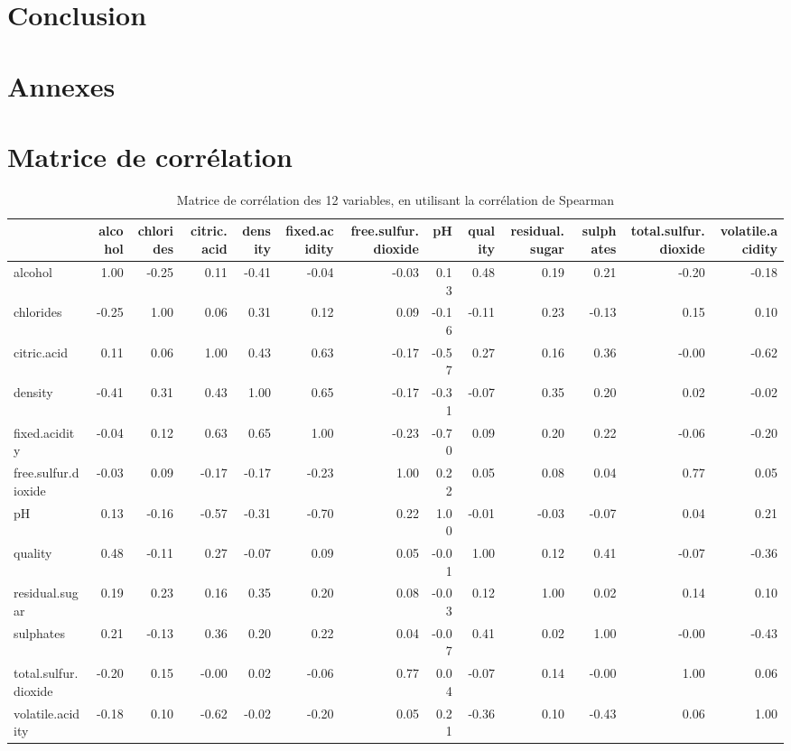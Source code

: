 \documentclass[11pt,a4paper]{article}
\begin{document}
\section{Conclusion}

\newpage
\section{Annexes}
\appendix
\section{Matrice de corrélation}
\label{sec:cor}
\begin{table}[h]
	\centering
	\begin{adjustbox}{width=1\textwidth}
	\begin{tabular}{lrrrrrrrrrrrr}
		\hline
		& alcohol & chlorides & citric.acid & density & fixed.acidity & free.sulfur.dioxide & pH & quality & residual.sugar & sulphates & total.sulfur.dioxide & volatile.acidity \\ 
		\hline
		alcohol & 1.00 & -0.25 & 0.11 & -0.41 & -0.04 & -0.03 & 0.13 & 0.48 & 0.19 & 0.21 & -0.20 & -0.18 \\ 
		chlorides & -0.25 & 1.00 & 0.06 & 0.31 & 0.12 & 0.09 & -0.16 & -0.11 & 0.23 & -0.13 & 0.15 & 0.10 \\ 
		citric.acid & 0.11 & 0.06 & 1.00 & 0.43 & 0.63 & -0.17 & -0.57 & 0.27 & 0.16 & 0.36 & -0.00 & -0.62 \\ 
		density & -0.41 & 0.31 & 0.43 & 1.00 & 0.65 & -0.17 & -0.31 & -0.07 & 0.35 & 0.20 & 0.02 & -0.02 \\ 
		fixed.acidity & -0.04 & 0.12 & 0.63 & 0.65 & 1.00 & -0.23 & -0.70 & 0.09 & 0.20 & 0.22 & -0.06 & -0.20 \\ 
		free.sulfur.dioxide & -0.03 & 0.09 & -0.17 & -0.17 & -0.23 & 1.00 & 0.22 & 0.05 & 0.08 & 0.04 & 0.77 & 0.05 \\ 
		pH & 0.13 & -0.16 & -0.57 & -0.31 & -0.70 & 0.22 & 1.00 & -0.01 & -0.03 & -0.07 & 0.04 & 0.21 \\ 
		quality & 0.48 & -0.11 & 0.27 & -0.07 & 0.09 & 0.05 & -0.01 & 1.00 & 0.12 & 0.41 & -0.07 & -0.36 \\ 
		residual.sugar & 0.19 & 0.23 & 0.16 & 0.35 & 0.20 & 0.08 & -0.03 & 0.12 & 1.00 & 0.02 & 0.14 & 0.10 \\ 
		sulphates & 0.21 & -0.13 & 0.36 & 0.20 & 0.22 & 0.04 & -0.07 & 0.41 & 0.02 & 1.00 & -0.00 & -0.43 \\ 
		total.sulfur.dioxide & -0.20 & 0.15 & -0.00 & 0.02 & -0.06 & 0.77 & 0.04 & -0.07 & 0.14 & -0.00 & 1.00 & 0.06 \\ 
		volatile.acidity & -0.18 & 0.10 & -0.62 & -0.02 & -0.20 & 0.05 & 0.21 & -0.36 & 0.10 & -0.43 & 0.06 & 1.00 \\ 
		\hline
	\end{tabular}
	\end{adjustbox}
\caption{Matrice de corrélation des 12 variables, en utilisant la corrélation de Spearman}
\label{table:cor}
\end{table}
\FloatBarrier
\end{document}
